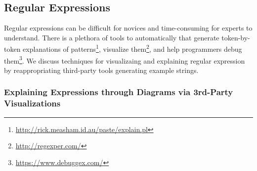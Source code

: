 \begin{figure}
\end{figure}

\subsection{Regular Expressions}

\begin{changes}
Regular expressions can be difficult for novices and time-consuming for experts to understand.
There is a plethora of tools to automatically that generate token-by-token explanations of patterns\footnote{\url{http://rick.measham.id.au/paste/explain.pl}}, visualize them\footnote{\url{http://regexper.com/}}, and help programmers debug them\footnote{\url{https://www.debuggex.com/}}.
We discuss techniques for visualizaing and explaining regular expression by reappropriating third-party tools generating example strings.
\end{changes}

\subsubsection{Explaining Expressions through Diagrams via 3rd-Party Visualizations}

